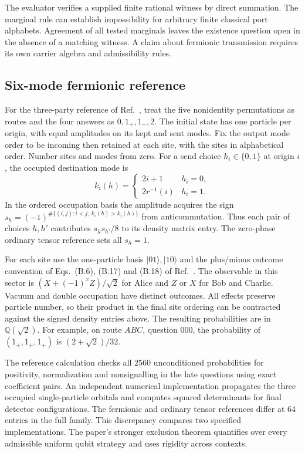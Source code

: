 The evaluator verifies a supplied finite rational witness by direct summation.
The marginal rule can establish impossibility for arbitrary finite classical
port alphabets. Agreement of all tested marginals leaves the existence question
open in the absence of a matching witness. A claim about fermionic transmission
requires its own carrier algebra and admissibility rules.

\subsection{Six-mode fermionic reference}

For the three-party reference of Ref.~\cite{kalarde2026fermions}, treat the
five nonidentity permutations as routes and the four answers as
$0,1_+,1_-,2$. The initial state has one particle per origin, with equal
amplitudes on its kept and sent modes. Fix the output mode order to be
incoming then retained at each site, with the sites in alphabetical order.
Number sites and modes from zero. For a send choice $h_i\in\{0,1\}$ at origin
$i$, the occupied destination mode is
\[
 k_i(h)=\begin{cases}
  2i+1 & h_i=0,\\
  2r^{-1}(i) & h_i=1 .
 \end{cases}
\]
In the ordered occupation basis the amplitude acquires the sign
$s_h=(-1)^{\#\{(i,j):i<j,\ k_i(h)>k_j(h)\}}$ from anticommutation.
Thus each pair of choices $h,h'$ contributes $s_hs_{h'}/8$ to its density
matrix entry. The zero-phase ordinary tensor reference sets all $s_h=1$.

For each site use the one-particle basis $|01\rangle,|10\rangle$ and the
plus/minus outcome convention of Eqs.~(B.6), (B.17) and (B.18) of
Ref.~\cite{kalarde2026fermions}. The observable in this sector is
$(X+(-1)^x Z)/\sqrt{2}$ for Alice and $Z$ or $X$ for Bob and Charlie.
Vacuum and double occupation have distinct outcomes. All effects preserve
particle number, so their product in the final site ordering can be contracted
against the signed density entries above. The resulting probabilities are
in $\mathbb{Q}(\sqrt{2})$. For example, on route $ABC$, question $000$,
the probability of $(1_+,1_+,1_+)$ is $(2+\sqrt{2})/32$.

The reference calculation checks all $2560$ unconditioned probabilities
for positivity, normalization and nonsignalling in the late questions using
exact coefficient pairs. An independent numerical implementation propagates
the three occupied single-particle orbitals and computes squared determinants
for final detector configurations. The fermionic and ordinary tensor
references differ at $64$ entries in the full family. This discrepancy compares
two specified implementations. The paper's stronger exclusion theorem
quantifies over every admissible uniform qubit strategy and uses rigidity
across contexts.
